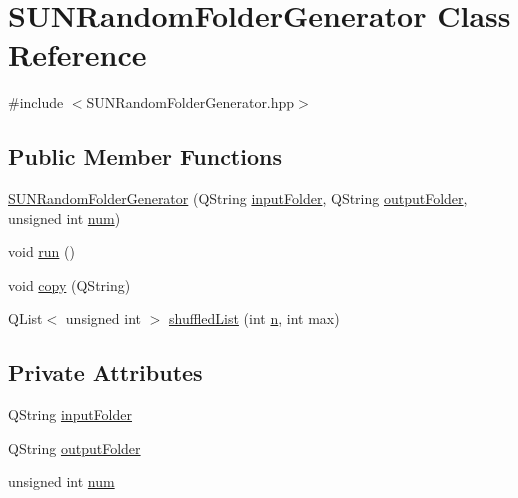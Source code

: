 \hypertarget{class_s_u_n_random_folder_generator}{\section{S\+U\+N\+Random\+Folder\+Generator Class Reference}
\label{class_s_u_n_random_folder_generator}
}


{\ttfamily \#include $<$S\+U\+N\+Random\+Folder\+Generator.\+hpp$>$}

\subsection*{Public Member Functions}
\begin{DoxyCompactItemize}
\item 
\hyperlink{class_s_u_n_random_folder_generator_ace7843ac3121b56fa6942d592cc43215}{S\+U\+N\+Random\+Folder\+Generator} (Q\+String \hyperlink{class_s_u_n_random_folder_generator_a3f9525ed0cca76258f89630fa1b23512}{input\+Folder}, Q\+String \hyperlink{class_s_u_n_random_folder_generator_a3a23fbc7b969530de102838cf9566f3e}{output\+Folder}, unsigned int \hyperlink{class_s_u_n_random_folder_generator_a0fdde54a3c62efd013f0b05c49abd884}{num})
\item 
void \hyperlink{class_s_u_n_random_folder_generator_a768be016f5c824edf5d19eb5a88ab3b8}{run} ()
\item 
void \hyperlink{class_s_u_n_random_folder_generator_a2e06d62fb796eb5222e79a8068593b8d}{copy} (Q\+String)
\item 
Q\+List$<$ unsigned int $>$ \hyperlink{class_s_u_n_random_folder_generator_a515728ee2e168336b2e0e0f72cc86813}{shuffled\+List} (int \hyperlink{print_report_8m_aeab71244afb687f16d8c4f5ee9d6ef0e}{n}, int max)
\end{DoxyCompactItemize}
\subsection*{Private Attributes}
\begin{DoxyCompactItemize}
\item 
Q\+String \hyperlink{class_s_u_n_random_folder_generator_a3f9525ed0cca76258f89630fa1b23512}{input\+Folder}
\item 
Q\+String \hyperlink{class_s_u_n_random_folder_generator_a3a23fbc7b969530de102838cf9566f3e}{output\+Folder}
\item 
unsigned int \hyperlink{class_s_u_n_random_folder_generator_a0fdde54a3c62efd013f0b05c49abd884}{num}
\end{DoxyCompactItemize}


